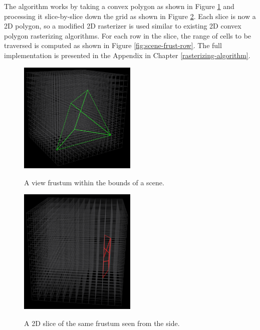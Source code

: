 \documentclass[12pt]{ucthesis}
\newcommand{\captionfonts}{\small\bf\ssp}
\begin{document}
The algorithm works by taking a convex polygon as shown in Figure \ref{fig:scene-frust} and processing it slice-by-slice down the grid as shown in Figure \ref{fig:scene-frust-slice}.
Each slice is now a 2D polygon, so a modified 2D rasterizer is used similar to existing 2D convex polygon rasterizing algorithms.
For each row in the slice, the range of cells to be traversed is computed as shown in Figure \ref{fig:scene-frust-row}.
The full implementation is presented in the Appendix in Chapter \ref{rasterizing-algorithm}.

\begin{figure}
\begin{center}
\includegraphics[width=0.5\textwidth]{Images/RasterizingAlgorithm/Final/Frust.png}
\captionfonts
\caption[A Frustum]{A view frustum within the bounds of a scene.}
\label{fig:scene-frust}
\end{center}
\end{figure}

\begin{figure}
\begin{center}
\includegraphics[width=0.5\textwidth]{Images/RasterizingAlgorithm/Final/FrustSlice.png}
\captionfonts
\caption[A Frustum Slice]{A 2D slice of the same frustum seen from the side.}
\label{fig:scene-frust-slice}
\end{center}
\end{figure}
\end{document}
